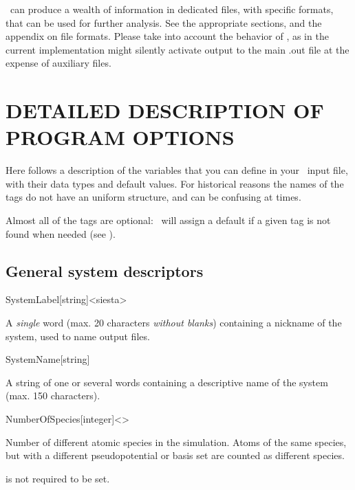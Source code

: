 \siesta\ can produce a wealth of information in dedicated files,
with specific formats, that can be used for further analysis. See the
appropriate sections, and the appendix on file formats.
Please take into account the behavior of
, as in the current implementation might silently
activate output to the main .out file at the expense of auxiliary
files.


\section{DETAILED DESCRIPTION OF PROGRAM OPTIONS}


Here follows a description of the variables that you can define in
your \siesta\ input file, with their data types and default
values. For historical reasons the names of the tags do not have an
uniform structure, and can be confusing at times.

Almost all of the tags are optional: \siesta\ will assign a
default if a given tag is not found when needed (see ).


\subsection{General system descriptors}

\begin{fdfentry}{SystemLabel}[string]<siesta>
  
  A \emph{single} word (max. 20 characters \emph{without blanks})
  containing a nickname of the system, used to name output files.

\end{fdfentry}


\begin{fdfentry}{SystemName}[string]

  A string of one or several words containing a descriptive name of
  the system (max. 150 characters).
  
\end{fdfentry}


\begin{fdfentry}{NumberOfSpecies}[integer]<>

  Number of different atomic species in the simulation.  Atoms of the
  same species, but with a different pseudopotential or basis set are
  counted as different species.

  \note is not required to be set.
  
\end{fdfentry}

